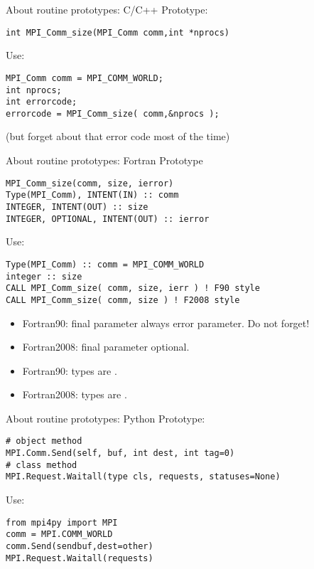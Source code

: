 \begin{frame}[containsverbatim]{About routine prototypes: C/C++}
  \label{sec:protos}
Prototype:
\lstset{language=C}
\begin{lstlisting}
int MPI_Comm_size(MPI_Comm comm,int *nprocs)
\end{lstlisting}
Use:
\lstset{language=C}
\begin{lstlisting}
MPI_Comm comm = MPI_COMM_WORLD;
int nprocs;
int errorcode;
errorcode = MPI_Comm_size( comm,&nprocs );
\end{lstlisting}
(but forget about that error code most of the time)
\end{frame}

\begin{frame}[containsverbatim]{About routine prototypes: Fortran}
Prototype
\lstset{language=Fortran}
\begin{lstlisting}
MPI_Comm_size(comm, size, ierror)
Type(MPI_Comm), INTENT(IN) :: comm
INTEGER, INTENT(OUT) :: size
INTEGER, OPTIONAL, INTENT(OUT) :: ierror
\end{lstlisting}
Use:
\lstset{language=Fortran}
\begin{lstlisting}
Type(MPI_Comm) :: comm = MPI_COMM_WORLD
integer :: size
CALL MPI_Comm_size( comm, size, ierr ) ! F90 style
CALL MPI_Comm_size( comm, size ) ! F2008 style
\end{lstlisting}
\begin{itemize}
\item Fortran90: final parameter always error parameter. Do not
  forget!
\item Fortran2008: final parameter optional.
\item Fortran90:  types are .
\item Fortran2008:  types are .
\end{itemize}
\end{frame}

\begin{frame}[containsverbatim]{About routine prototypes: Python}
Prototype:
\lstset{language=Python}
\begin{lstlisting}
# object method
MPI.Comm.Send(self, buf, int dest, int tag=0)
# class method
MPI.Request.Waitall(type cls, requests, statuses=None)
\end{lstlisting}
Use:
\begin{lstlisting}
from mpi4py import MPI
comm = MPI.COMM_WORLD
comm.Send(sendbuf,dest=other)
MPI.Request.Waitall(requests)
\end{lstlisting}
\end{frame}


